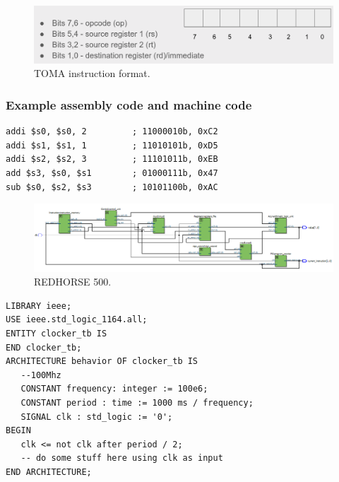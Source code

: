\documentclass[a4paper, 11pt,oneside]{article}
\begin{document}
\begin{figure}[H]
	\begin{center}
	\includegraphics[width=5in]{ins_format.png}
	\caption{TOMA instruction format.}
	\label{fig:ins_format} 
	\end{center}
\end{figure}

\subsubsection{Example assembly code and machine code}
\begin{verbatim}
addi $s0, $s0, 2         ; 11000010b, 0xC2
addi $s1, $s1, 1         ; 11010101b, 0xD5
addi $s2, $s2, 3         ; 11101011b, 0xEB
add $s3, $s0, $s1        ; 01000111b, 0x47
sub $s0, $s2, $s3        ; 10101100b, 0xAC
\end{verbatim}

\begin{landscape}
\thispagestyle{plain}
\begin{figure}[H]
	\begin{center}
	\includegraphics[width=10.5in]{redhorse500.png}
	\caption{REDHORSE 500.}
	\label{fig:clock0} 
	\end{center}
\end{figure}
\end{landscape}

\begin{verbatim}
LIBRARY ieee;
USE ieee.std_logic_1164.all;
ENTITY clocker_tb IS
END clocker_tb;
ARCHITECTURE behavior OF clocker_tb IS
   --100Mhz
   CONSTANT frequency: integer := 100e6; 
   CONSTANT period : time := 1000 ms / frequency;
   SIGNAL clk : std_logic := '0';
BEGIN 
   clk <= not clk after period / 2;
   -- do some stuff here using clk as input
END ARCHITECTURE;
\end{verbatim}
\end{document}
